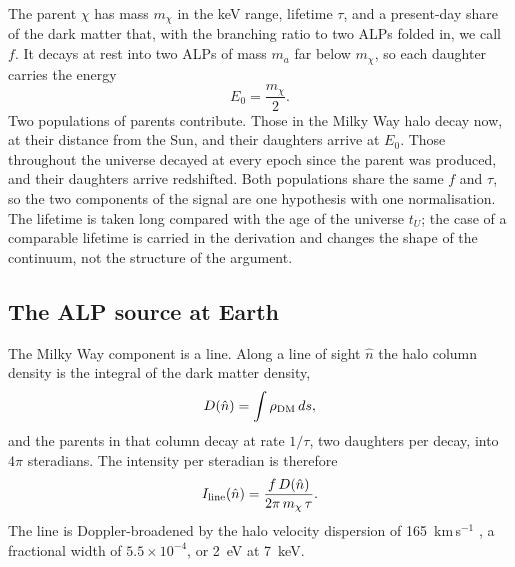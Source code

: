\documentclass[11pt]{article}
\begin{document}
The parent $\chi$ has mass $m_\chi$ in the keV range, lifetime $\tau$, and a present-day share of the dark matter that, with the branching ratio to two ALPs folded in, we call $f$. It decays at rest into two ALPs of mass $m_a$ far below $m_\chi$, so each daughter carries the energy
\begin{equation}
E_0=\frac{m_\chi}{2}.
\label{eq:e0}
\end{equation}
Two populations of parents contribute. Those in the Milky Way halo decay now, at their distance from the Sun, and their daughters arrive at $E_0$. Those throughout the universe decayed at every epoch since the parent was produced, and their daughters arrive redshifted. Both populations share the same $f$ and $\tau$, so the two components of the signal are one hypothesis with one normalisation. The lifetime is taken long compared with the age of the universe $t_U$; the case of a comparable lifetime is carried in the derivation and changes the shape of the continuum, not the structure of the argument.

\subsection{The ALP source at Earth}

The Milky Way component is a line. Along a line of sight $\hat n$ the halo column density is the integral of the dark matter density,
\begin{equation}
D(\hat n)=\int\rho_{\rm DM}\,ds ,
\label{eq:column}
\end{equation}
and the parents in that column decay at rate $1/\tau$, two daughters per decay, into $4\pi$ steradians. The intensity per steradian is therefore
\begin{equation}
I_{\rm line}(\hat n)=\frac{f\,D(\hat n)}{2\pi\,m_\chi\,\tau}.
\label{eq:line}
\end{equation}
The line is Doppler-broadened by the halo velocity dispersion of 165~km\,s$^{-1}$ \citep{evans2019shm}, a fractional width of $5.5\times10^{-4}$, or 2~eV at 7~keV.
\end{document}
